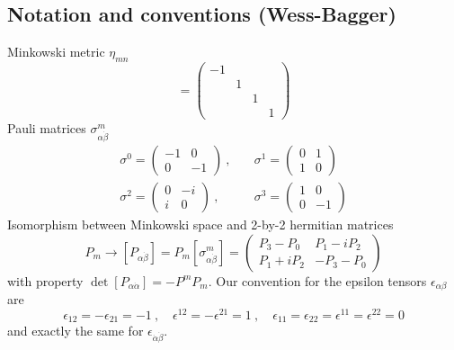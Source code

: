 \documentclass[a4paper,12pt]{article}
\numberwithin{equation}{section}
\numberwithin{exe}{section}
\renewcommand{\a}{{\alpha}}
\newcommand{\ad}{{\dot\alpha}}
\renewcommand{\b}{{\beta}}
\newcommand{\bd}{{\dot\beta}}
\newcommand{\e}{{\epsilon}}
\newcommand{\s}{{\sigma}}
\begin{document}
\subsection{Notation and conventions (Wess-Bagger)}
Minkowski metric $\eta_{mn}$
	\begin{equation}
	[\eta_{mn}] = \left(
		\begin{array}{cccc}
		-1 & & & \\
		& 1 & & \\
		& & 1 & \\
		& & & 1 
		\end{array}
	\right)
	\end{equation}
Pauli matrices $\s^m_{\a\bd}$
	\begin{equation}
		\begin{aligned}
		\s^0 = \left(
			\begin{array}{cc}
			-1 & 0 \\
			0 & -1
			\end{array}
		\right)\ ,&\quad \s^1=\left(
			\begin{array}{cc}
			0 & 1 \\
			1 & 0
			\end{array}
		\right) \\
		\s^2 = \left(
			\begin{array}{cc}
			0 & -i \\
			i & 0
			\end{array}
		\right)\ ,&\quad\s^3 = \left(
			\begin{array}{cc}
			1 & 0 \\
			0 & -1
			\end{array}
		\right)
		\end{aligned}
	\end{equation}
Isomorphism between Minkowski space and 2-by-2 hermitian matrices
	\begin{equation}
	P_m \longrightarrow [P_{\a\bd}] = P_m [\s^m_{\a\bd}] = \left(
		\begin{array}{cc}
		P_3 - P_0 & P_1 - iP_2 \\
		P_1 + iP_2 & -P_3 - P_0
		\end{array}
	\right)
	\end{equation}
with property $\det[P_{\a\ad}]= -P^mP_m$. Our convention for the epsilon tensors $\e_{\a\b}$ are
	\begin{equation}
	\e_{12} = -\e_{21} = -1\ ,\quad \e^{12} = - \e^{21} = 1\ ,\quad \e_{11} = \e_{22}=\e^{11}=\e^{22} = 0
	\end{equation}
and exactly the same for $\e_{\ad\bd}$.
\end{document}
